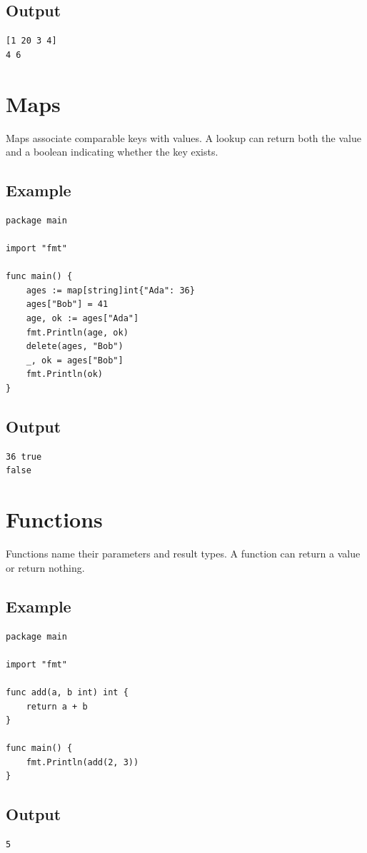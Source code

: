 \documentclass[10pt,oneside]{article}
\newcommand{\sectionline}{\par\vspace{4pt}{\color{rule}\hrule height .5pt}\vspace{7pt}\color{ink}\noindent}
\begin{document}
\subsection*{Output}
\begin{lstlisting}[style=terminal]
[1 20 3 4]
4 6
\end{lstlisting}
\clearpage
\section{Maps}
\sectionline
Maps associate comparable keys with values. A lookup can return both the value and a boolean indicating whether the key exists.\par
\subsection*{Example}
\begin{lstlisting}[style=gocode]
package main

import "fmt"

func main() {
	ages := map[string]int{"Ada": 36}
	ages["Bob"] = 41
	age, ok := ages["Ada"]
	fmt.Println(age, ok)
	delete(ages, "Bob")
	_, ok = ages["Bob"]
	fmt.Println(ok)
}
\end{lstlisting}
\subsection*{Output}
\begin{lstlisting}[style=terminal]
36 true
false
\end{lstlisting}
\clearpage
\section{Functions}
\sectionline
Functions name their parameters and result types. A function can return a value or return nothing.\par
\subsection*{Example}
\begin{lstlisting}[style=gocode]
package main

import "fmt"

func add(a, b int) int {
	return a + b
}

func main() {
	fmt.Println(add(2, 3))
}
\end{lstlisting}
\subsection*{Output}
\begin{lstlisting}[style=terminal]
5
\end{lstlisting}
\clearpage
\end{document}
